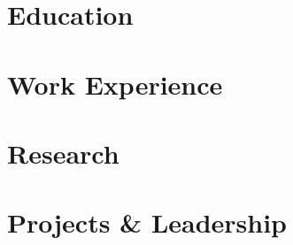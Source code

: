 \documentclass{cv}
\begin{document}

    \section{Education}
        

    \section{Work Experience}
        
        

    \section{Research}
        

    \section{Projects \& Leadership}
        
        
        
        
\end{document}
